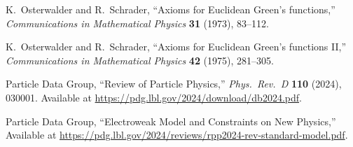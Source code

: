K.~Osterwalder and R.~Schrader,
``Axioms for Euclidean Green's functions,''
\emph{Communications in Mathematical Physics} \textbf{31} (1973), 83--112.

K.~Osterwalder and R.~Schrader,
``Axioms for Euclidean Green's functions II,''
\emph{Communications in Mathematical Physics} \textbf{42} (1975), 281--305.

Particle Data Group,
``Review of Particle Physics,''
\emph{Phys.\ Rev.\ D} \textbf{110} (2024), 030001.
Available at \url{https://pdg.lbl.gov/2024/download/db2024.pdf}.

Particle Data Group,
``Electroweak Model and Constraints on New Physics,''
Available at \url{https://pdg.lbl.gov/2024/reviews/rpp2024-rev-standard-model.pdf}.
